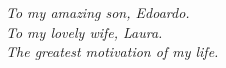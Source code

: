 \begin{center}
	\thispagestyle{empty}
	\vspace*{\fill}
	\begin{flushright}
	\textit{To my amazing son, Edoardo.\\To my lovely wife, Laura.\\The greatest motivation of my life.}
	\end{flushright}

	\vspace*{\fill}
\end{center}

